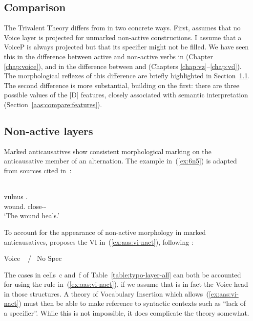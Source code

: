 \begin{exe}
\begin{xlist}
\begin{exe}
\begin{exe}
\begin{xlist}
\begin{exe}
\section{Comparison} \label{aas:compare}
The Trivalent Theory differs from  in two concrete ways. First,  assumes that no Voice layer is projected for unmarked non-active constructions. I assume that a VoiceP is always projected but that its specifier might not be filled. We have seen this in the difference between active and non-active verbs in {\tkal} (Chapter \ref{chap:voice}), and in the difference between {\vz} and {\vd} (Chapters \ref{chap:vz}--\ref{chap:vd}). The morphological reflexes of this difference are briefly highlighted in Section~\ref{aas:compare:vi-nact}. The second difference  is more substantial, building on the first: there are three possible values of the [D] features, closely associated with semantic interpretation (Section~\ref{aas:compare:features}).

	\subsection{Non-active layers} \label{aas:compare:vi-nact}
Marked anticausatives show consistent morphological marking on the anticausative member of an alternation. The  example in~(\ref{ex:6n5}) is adapted from sources cited in~\cite{kastnerzu17}:
 \begin{exe}
\ex   {}\label{ex:6n5}\\
  \gll vulnus .\\
 	  wound. close--\\
 	\glt `The wound heals.' 
	
 \z 

To account for the appearance of non-active morphology in marked anticausatives,  proposes the VI in~(\ref{ex:aas:vi-nact}), following \cite{embick04}:
 \begin{exe}
\ex \label{ex:aas:vi-nact}Voice \lra~ / \trace~No Spec 
 \z 

The cases in cells~c and~f of Table~\ref{table:typo-layer-all} can both be accounted for using the rule in~(\ref{ex:aas:vi-nact}), if we assume that {\vz} is in fact the Voice head in those structures. A theory of Vocabulary Insertion which allows~(\ref{ex:aas:vi-nact}) must then be able to make reference to syntactic contexts such as ``lack of a specifier''. While this is not impossible, it does complicate the theory somewhat.\label{r1:6:1}


\end{exe}
\end{exe}
\end{exe}
\end{xlist}
\end{exe}
\end{exe}
\end{xlist}
\end{exe}
